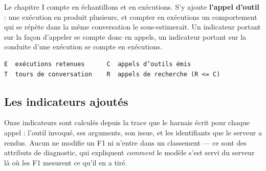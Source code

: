 Le chapitre I compte en échantillons et en exécutions. S'y ajoute \textbf{l'appel d'outil} : une exécution en produit plusieurs, et compter en exécutions un comportement qui se répète dans la même conversation le sous-estimerait. Un indicateur portant sur la façon d'appeler se compte donc en appels, un indicateur portant sur la conduite d'une exécution se compte en exécutions.

\begin{verbatim}
E  exécutions retenues      C  appels d’outils émis
T  tours de conversation    R  appels de recherche (R <= C)
\end{verbatim}

\subsection{Les indicateurs ajoutés}\label{sec:ch2-3-3}

Onze indicateurs sont calculés depuis la trace que le harnais écrit pour chaque appel : l'outil invoqué, ses arguments, son issue, et les identifiants que le serveur a rendus. Aucun ne modifie un F1 ni n'entre dans un classement --- ce sont des attributs de diagnostic, qui expliquent \emph{comment} le modèle s'est servi du serveur là où les F1 mesurent ce qu'il en a tiré.

